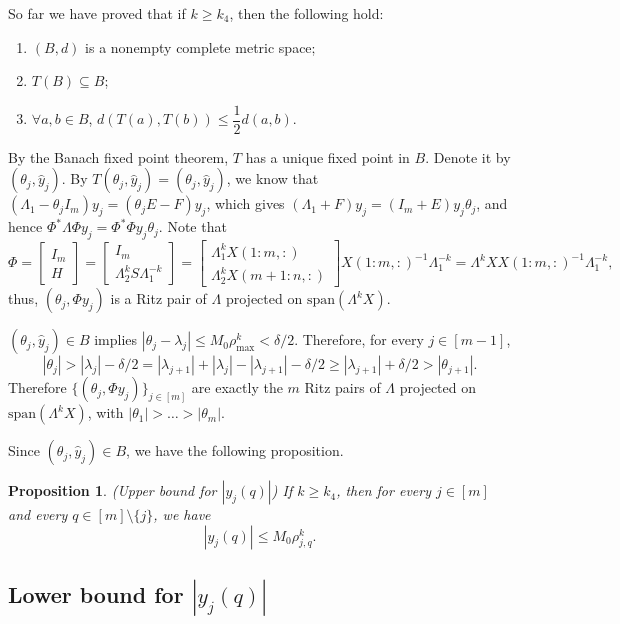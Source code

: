 \documentclass[11pt,a4paper]{article}
\theoremstyle{plain}              %
\newtheorem{proposition}[theorem]{Proposition}
\theoremstyle{definition}         %
\begin{document}
So far we have proved that if \(k\geq k_4\), then the following hold:
\begin{enumerate}
\item \((B,d)\) is a nonempty complete metric space;
\item \(T(B)\subseteq B\);
\item \(\forall a,b\in B\), \(d(T(a),T(b))\leq\dfrac{1}{2}d(a,b)\).
\end{enumerate}
By the Banach fixed point theorem, \(T\) has a unique fixed point in \(B\). Denote it by \((\theta_j,\hat{y}_j)\). By \(T(\theta_j,\hat{y}_j)=(\theta_j,\hat{y}_j)\), we know that\((\Lambda_1-\theta_jI_m)y_j=(\theta_jE-F)y_j\), which gives \((\Lambda_1+F)y_j=(I_m+E)y_j\theta_j\), and hence \(\Phi^*\Lambda\Phi y_j=\Phi^*\Phi y_j\theta_j\). Note that
\[
\Phi=\begin{bmatrix}
I_m\\
H
\end{bmatrix}=\begin{bmatrix}
I_m\\
\Lambda_2^kS\Lambda_1^{-k}
\end{bmatrix}=\begin{bmatrix}
\Lambda_1^kX(1:m,:)\\
\Lambda_2^kX(m+1:n,:)
\end{bmatrix}X(1:m,:)^{-1}\Lambda_1^{-k}=\Lambda^kXX(1:m,:)^{-1}\Lambda_1^{-k},
\]
thus, \((\theta_j,\Phi y_j)\) is a Ritz pair of \(\Lambda\) projected on \(\mathrm{span}(\Lambda^kX)\).

\((\theta_j,\hat{y}_j)\in B\) implies \(|\theta_j-\lambda_j|\leq M_0\rho_{\max}^k<\delta/2\). Therefore, for every \(j\in[m-1]\),
\[
|\theta_j|>|\lambda_j|-\delta/2=|\lambda_{j+1}|+|\lambda_j|-|\lambda_{j+1}|-\delta/2\geq |\lambda_{j+1}|+\delta/2>|\theta_{j+1}|.
\]
Therefore \(\{(\theta_j,\Phi y_j)\}_{j\in[m]}\) are exactly the \(m\) Ritz pairs of \(\Lambda\) projected on \(\mathrm{span}(\Lambda^kX)\), with \(|\theta_1|>\dots>|\theta_m|\).

Since \((\theta_j,\hat{y}_j)\in B\), we have the following proposition.

\begin{proposition}
(Upper bound for \(|y_j(q)|\)) If \(k\geq k_4\), then for every \(j\in[m]\) and every \(q\in[m]\setminus\{j\}\), we have
\[
|y_j(q)|\leq M_0\rho_{j,q}^k.
\]
\end{proposition}

\subsection{Lower bound for \(|y_j(q)|\)}
\end{document}

